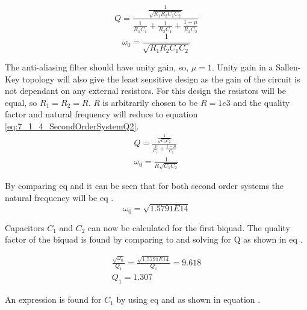 \begin{equation}\label{eq:7_1_4_SecondOrderSystemQ}
    Q = \frac{ \frac{1}{\sqrt{R_1R_2C_1C_2}} }{ \frac{1}{R_1C_1} + \frac{1}{R_2C_1} + \frac{1-\mu}{R_2C_2}}
 \end{equation}
 \begin{equation}\label{eq:7_1_4_SecondOrderSystemNatural}
    \omega_0 = \frac{1}{\sqrt{R_1 R_2 C_1 C_2}}
 \end{equation}

 The anti-aliasing filter should have unity gain, so, $\mu = 1$. Unity gain in a Sallen-Key topology will also give the least sensitive design as the gain of the circuit is not dependant on any external resistors. For this design the resistors will be equal, so $R_1 = R_2 = R$. $R$ is arbitrarily chosen to be $R = 1e3$ and the quality factor and natural frequency will reduce to equation \ref{eq:7_1_4_SecondOrderSystemQ2}.
 \begin{equation}\label{eq:7_1_4_SecondOrderSystemQ2}
    \begin{aligned}
        Q = \frac{ \frac{1}{\sqrt{C_1C_2}} }{ \frac{2}{C_1} + \frac{1-\mu}{C_2}}\\
        \omega_0 = \frac{1}{R\sqrt{C_1 C_2}}
    \end{aligned}
 \end{equation}

By comparing eq  and  it can be seen that for both second order systems the natural frequency will be eq .
\begin{equation}\label{eq:7_1_4_SecondOrderSystemNaturalFrq}
    \omega_0 = \sqrt{1.5791E14}
 \end{equation}

 Capacitors $C_1$ and $C_2$ can now be calculated for the first biquad. The quality factor of the biquad is found by comparing  to  and solving for Q as shown in eq .

 \begin{equation}\label{eq:7_1_4_Q1}
    \begin{aligned}
        \frac{\sqrt{\omega_0}}{Q_1} = \frac{\sqrt{1.5791E14}}{Q_1}= 9.618\\
        Q_1 = 1.307
    \end{aligned}
 \end{equation}

 An expression is found for $C_1$ by using eq  and  as shown in equation .

